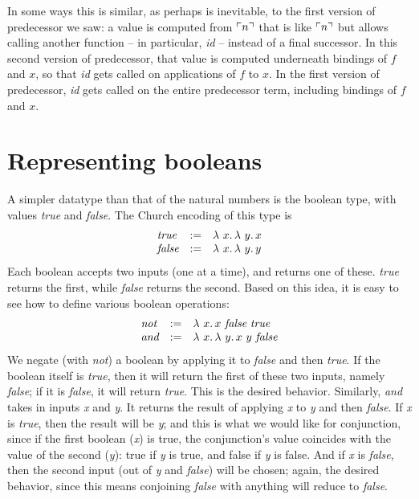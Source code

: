 In some ways this is similar, as perhaps is inevitable, to the first
version of predecessor we saw: a value is computed from $\ulcorner n \urcorner$ that
is like $\ulcorner n \urcorner$ but allows calling another function -- in particular, \textit{id} -- instead of a
final successor.  In this second version of predecessor, that
value is computed underneath bindings of $f$ and $x$, so that
\textit{id} gets called on applications of $f$ to $x$.  In the
first version of predecessor, \textit{id} gets called on the entire
predecessor term, including bindings of $f$ and $x$.

\section{Representing booleans}
\label{sec:bool}

A simpler datatype than that of the natural numbers is the boolean
type, with values \textit{true} and \textit{false}.  The Church
encoding of this type is
\[
\begin{array}{lll}
  \textit{true} & := & \lambda\ x.\, \lambda\ y.\, x \\
  \textit{false} & := & \lambda\ x.\, \lambda\ y.\, y
\end{array}
\]
\noindent Each boolean accepts two inputs (one at a time), and returns
one of these.  \textit{true} returns the first, while \textit{false}
returns the second.  Based on this idea, it is easy to see how to define
various boolean operations:
\[
\begin{array}{lll}
  \textit{not} & := & \lambda\ x.\, x\ \textit{false}\ \textit{true} \\
  \textit{and} & := & \lambda\ x.\, \lambda\ y.\, x\ y\ \textit{false}
\end{array}
\]
\noindent We negate (with \textit{not}) a boolean by applying it to
\textit{false} and then \textit{true}.  If the boolean itself is
\textit{true}, then it will return the first of these two inputs,
namely \textit{false}; if it is \textit{false}, it will return
\textit{true}.  This is the desired behavior.  Similarly, \textit{and}
takes in inputs \textit{x} and \textit{y}.  It returns the result of
applying \textit{x} to \textit{y} and then \textit{false}.  If
\textit{x} is \textit{true}, then the result will be \textit{y}; and
this is what we would like for conjunction, since if the first boolean
(\textit{x}) is true, the conjunction's value coincides with the value
of the second (\textit{y}): true if \textit{y} is true, and false if
\textit{y} is false.  And if \textit{x} is \textit{false}, then the
second input (out of \textit{y} and \textit{false}) will be chosen; again,
the desired behavior, since this means conjoining \textit{false} with
anything will reduce to \textit{false}.


